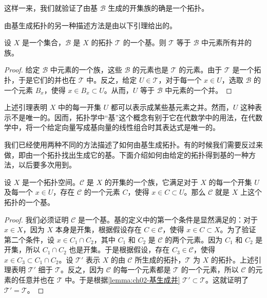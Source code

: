 \documentclass[../../main.tex]{subfiles}
\begin{document}
这样一来，我们就验证了由基 $\mathcal{B}$ 生成的开集族的确是一个拓扑。

由基生成拓扑的另一种描述方法是由以下引理给出的。

\begin{lemma}[基生成拓扑即基元素之并]\label{lemma:ch02-基生成并}
设 $X$ 是一个集合，$\mathcal{B}$ 是 $X$ 的拓扑 $\mathcal{T}$ 的一个基。则 $\mathcal{T}$ 等于 $\mathcal{B}$ 中元素所有并的族。
\end{lemma}

\begin{proof}
给定 $\mathcal{B}$ 中元素的一个族，这些 $\mathcal{B}$ 的元素也是 $\mathcal{T}$ 的元素。由于 $\mathcal{T}$ 是一个拓扑，于是它们的并也在 $\mathcal{T}$ 中。反之，给定 $U \in \mathcal{T}$，对于每一个 $x \in U$，选取 $\mathcal{B}$ 的一个元素 $B_{x}$，使得 $x \in B_{x} \subset U$。从而，$U$ 等于 $\mathcal{B}$ 中元素的一个并。
\end{proof}

上述引理表明 $X$ 中的每一开集 $U$ 都可以表示成某些基元素之并。然而，$U$ 这种表示不是唯一的。因而，拓扑学中“基”这个概念有别于它在代数学中的用法，在代数学中，将一个给定向量写成基向量的线性组合时其表达式是唯一的。

我们已经使用两种不同的方法描述了如何由基生成拓扑。有的时候我们需要反过来做，即由一个拓扑找出生成它的基。下面介绍如何由给定的拓扑得到基的一种方法，以后要多次用到。

\begin{lemma}[开集族为基]\label{lemma:ch02-开集族为基}
设 $X$ 是一个拓扑空间。$\mathcal{C}$ 是 $X$ 的开集的一个族，它满足对于 $X$ 的每一个开集 $U$ 及每一个 $x \in U$，存在 $\mathcal{C}$ 的一个元素 $C$，使得 $x \in C \subset U$。那么 $\mathcal{C}$ 就是 $X$ 上这个拓扑的一个基。
\end{lemma}

\begin{proof}
我们必须证明 $\mathcal{C}$ 是一个基。基的定义中的第一个条件是显然满足的：对于 $x \in X$，因为 $X$ 本身是开集，根据假设存在 $C \in \mathcal{C}$，使得 $x \in C \subset X$。为了验证第二个条件，设 $x \in C_{1} \cap C_{2}$，其中 $C_{1}$ 和 $C_{2}$ 是 $\mathcal{C}$ 的两个元素。因为 $C_{1}$ 和 $C_{2}$ 是开集，所以 $C_{1} \cap C_{2}$ 也是开集。于是根据假设，存在 $C_{3} \in \mathcal{C}$，使得 $x \in C_{3} \subset C_{1} \cap C_{2}$。设 $\mathcal{T}'$ 表示 $X$ 的由 $\mathcal{C}$ 所生成的拓扑，$\mathcal{T}$ 为 $X$ 的拓扑。上述引理表明 $\mathcal{T}'$ 细于 $\mathcal{T}$。反之，因为 $\mathcal{C}$ 的每一个元素都是 $\mathcal{T}$ 的一个元素，所以 $\mathcal{C}$ 的元素的任意并也在 $\mathcal{T}$ 中。于是根据\cref{lemma:ch02-基生成并} $\mathcal{T}' \subset \mathcal{T}$。这就证明了 $\mathcal{T}' = \mathcal{T}$。
\end{proof}
\end{document}
